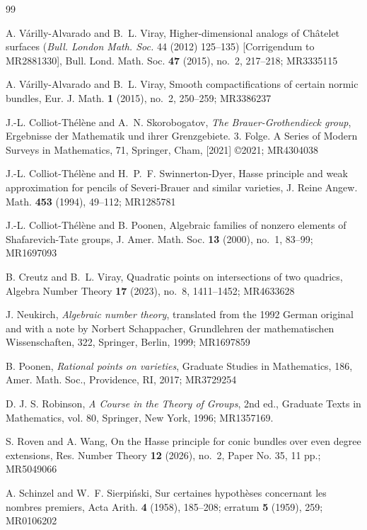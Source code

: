 \begin{thebibliography}{99}

A. V\'arilly-Alvarado and B.~L. Viray, Higher-dimensional analogs of Ch\^atelet surfaces ({\it Bull. London Math. Soc.} 44 (2012) 125--135) [Corrigendum to MR2881330], Bull. Lond. Math. Soc. {\bf 47} (2015), no.~2, 217--218; MR3335115

A. V\'arilly-Alvarado and B.~L. Viray, Smooth compactifications of certain normic bundles, Eur. J. Math. {\bf 1} (2015), no.~2, 250--259; MR3386237

 J.-L. Colliot-Th\'el\`ene and A.~N. Skorobogatov, {\it The Brauer-Grothendieck group}, Ergebnisse der Mathematik und ihrer Grenzgebiete. 3. Folge. A Series of Modern Surveys in Mathematics, 71, Springer, Cham, [2021] \copyright 2021; MR4304038

 J.-L. Colliot-Th\'el\`ene and H.~P.~F. Swinnerton-Dyer, Hasse principle and weak approximation for pencils of Severi-Brauer and similar varieties, J. Reine Angew. Math. {\bf 453} (1994), 49--112; MR1285781

J.-L. Colliot-Th\'el\`ene and B. Poonen, Algebraic families of nonzero elements of Shafarevich-Tate groups, J. Amer. Math. Soc. {\bf 13} (2000), no.~1, 83--99; MR1697093

 B. Creutz and B.~L. Viray, Quadratic points on intersections of two quadrics, Algebra Number Theory {\bf 17} (2023), no.~8, 1411--1452; MR4633628

J. Neukirch, {\it Algebraic number theory}, translated from the 1992 German original and with a note by Norbert Schappacher, 
Grundlehren der mathematischen Wissenschaften, 322, Springer, Berlin, 1999; MR1697859

B. Poonen, {\it Rational points on varieties}, Graduate Studies in Mathematics, 186, Amer. Math. Soc., Providence, RI, 2017; MR3729254

D. J. S. Robinson, {\it A Course in the Theory of Groups}, 2nd ed., Graduate Texts in Mathematics, vol. 80, Springer, New York, 1996; MR1357169.

 S. Roven and A. Wang, On the Hasse principle for conic bundles over even degree extensions, Res. Number Theory {\bf 12} (2026), no.~2, Paper No. 35, 11 pp.; MR5049066

A. Schinzel and W.~F. Sierpi\'nski, Sur certaines hypoth\`eses concernant les nombres premiers, Acta Arith. {\bf 4} (1958), 185--208; erratum {\bf 5} (1959), 259; MR0106202


\end{thebibliography}
